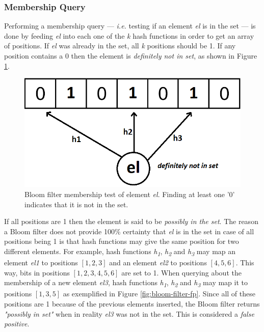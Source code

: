 \subsubsection*{Membership Query}
Performing a membership query --- \textit{i.e.} testing if an element \textit{el} is in the set --- is done by feeding \textit{el} into each one of the \textit{k} hash functions in order to get an array of positions. If \textit{el} was already in the set, all \textit{k} positions should be 1. If any position contains a 0 then the element is \textit{definitely not in set}, as shown in Figure \ref{fig:bloom-filter}. 

\begin{figure}[!htb]
    \begin{center}
      \includegraphics[scale=0.4]{figures/query-bloom.png}
      \caption[Bloom filter membership query]{Bloom filter membership test of element \textit{el}. Finding at least one '0' indicates that it is not in the set.}
      \label{fig:bloom-filter}
    \end{center}
\end{figure}

If all positions are 1 then the element is said to be \textit{possibly in the set}. The reason a Bloom filter does not provide 100\% certainty that \textit{el} is in the set in case of all positions being 1 is that hash functions may give the same position for two different elements. For example, hash functions \textit{h\textsubscript{1}}, \textit{h\textsubscript{2}} and \textit{h\textsubscript{3}} may map an element \textit{el1} to positions $[1,2,3]$ and an element \textit{el2} to positions $[4,5,6]$. This way, bits in positions $[1,2,3,4,5,6]$ are set to 1. When querying about the membership of a new element \textit{el3}, hash functions \textit{h\textsubscript{1}}, \textit{h\textsubscript{2}} and \textit{h\textsubscript{3}} may map it to positions $[1,3,5]$ as exemplified in Figure \ref{fig:bloom-filter-fp}. Since all of these positions are 1 because of the previous elements inserted, the Bloom filter returns \textit{"possibly in set"} when in reality \textit{el3} was not in the set. This is considered a \textit{false positive}.

